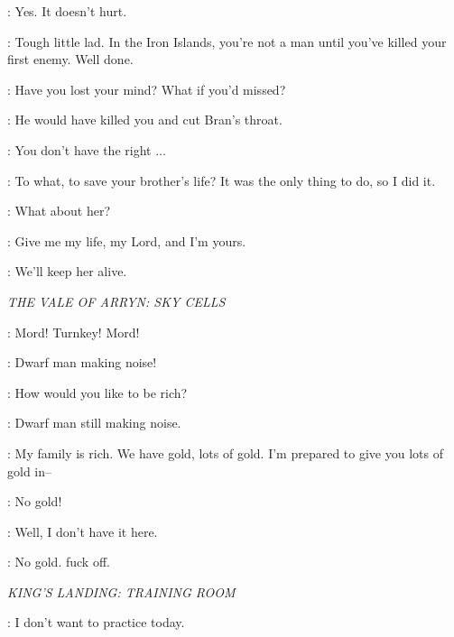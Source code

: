 \BRAN: Yes. It doesn't hurt. 

\THEON: Tough little lad. In the Iron Islands, you're not a man until you've killed your first enemy. Well done. 

\ROBB: Have you lost your mind? What if you'd missed? 

\THEON: He would have killed you and cut Bran's throat. 

\ROBB: You don't have the right $\ldots$ 

\THEON: To what, to save your brother's life? It was the only thing to do, so I did it. 

\ROBB: What about her? 

\OSHA: Give me my life, my Lord, and I'm yours. 

\ROBB: We'll keep her alive. 


\scene

\textit{THE VALE OF ARRYN: SKY CELLS} 


\TYRION: Mord! Turnkey! Mord! 


\MORD: Dwarf man making noise! 


\TYRION: How would you like to be rich? 

\MORD:  Dwarf man still making noise. 

\TYRION: My family is rich. We have gold, lots of gold. I'm prepared to give you lots of gold in-- 


\MORD: No gold! 

\TYRION: Well, I don't have it here. 

\MORD:  No gold. fuck off. 



\scene

\textit{KING'S LANDING: TRAINING ROOM} 


\ARYA: I don't want to practice today. 


